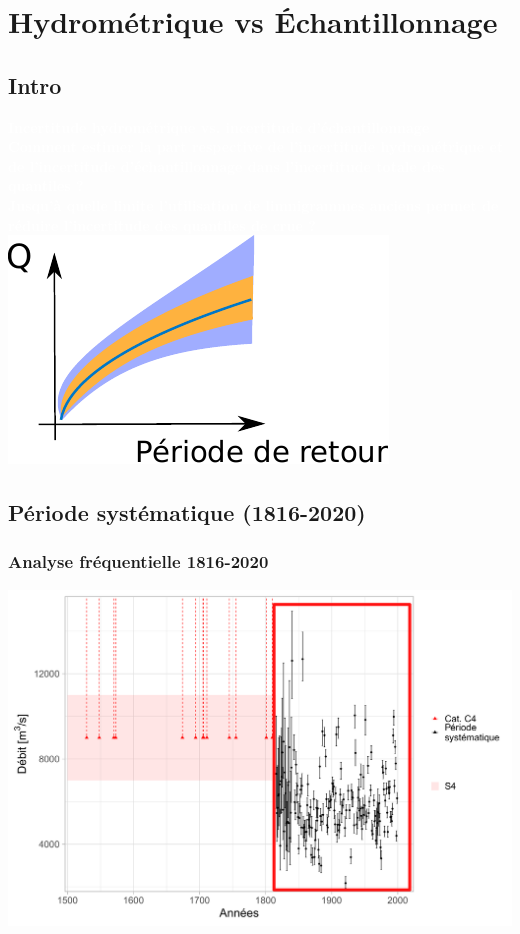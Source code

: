 \documentclass[compress,9pt]{beamer}
\begin{document}
\section{Hydrométrique vs Échantillonnage}
	\subsection{Intro}
	{
    \begin{frame}
        \begin{center}
        	\vfill
        	\textcolor{white}{\Large \textbf{Incertitude hydrométrique vs. incertitude d'échantillonnage}}\\
		\vfill
		\textcolor{white}{\large \textbf{Comment estimer la part respective de l'incertitude hydrométrique et de l'incertitude d'échantillonnage dans l'incertitude totale des quantiles ?\\
		\vspace{0.5cm}
		Jusqu'à quelle limite l'utilisation de limnigrammes anciens permet de réduire l'incertitude des quantiles de crue ?
		}}
		\vfill
	 	\includegraphics[width = .3\textwidth]{./Figures/Qpart.pdf} 
        \end{center}
    \end{frame}
    }

	\subsection{Période systématique (1816-2020)}
	\begin{frame}
		\frametitle{Analyse fréquentielle 1816-2020}
		\centering
		\includegraphics[width = .9\textwidth]{./Figures/EchMixteC4Bcr1.pdf} 
	\end{frame}
	
\end{document}
